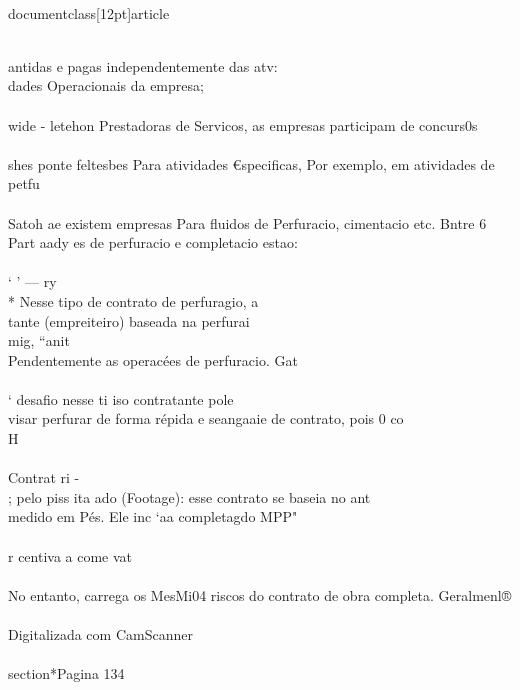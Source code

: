 \\documentclass[12pt]{article}
\begin{document}
\\
antidas e pagas independentemente das atv:\\
dades Operacionais da empresa;\\
\\
wide - letehon Prestadoras de Servicos, as empresas participam de concurs0s\\
\\
shes ponte feltesbes Para atividades €specificas, Por exemplo, em atividades de petfu\\
\\
Satoh ae existem empresas Para fluidos de Perfuracio, cimentacio etc. Bntre 6\\
Part aady es de perfuracio e completacio estao:\\
\\
‘ ’ — ry\\
* Nesse tipo de contrato de perfuragio, a\\
tante (empreiteiro) baseada na perfurai\\
mig, “anit\\
Pendentemente as operacées de perfuracio. Gat\\
\\
‘ desafio nesse ti iso contratante pole\\
visar perfurar de forma répida e seangaaie de contrato, pois 0 co\\
H\\
\\
Contrat ri -\\
; pelo piss ita ado (Footage): esse contrato se baseia no ant\\
 medido em Pés. Ele inc ‘aa completagdo MPP"\\
\\
r centiva a come vat\\
\\
No entanto, carrega os MesMi04 riscos do contrato de obra completa. Geralmenl®\\
\\
Digitalizada com CamScanner\\

\\section*{Pagina 134}
\end{document}
